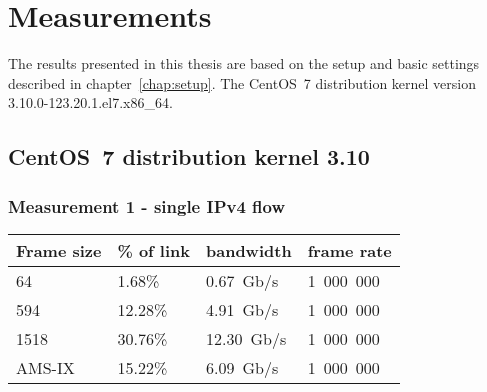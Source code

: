 
\chapter{Measurements}\label{chap:measurements}
The results presented in this thesis are based on the setup and basic settings described in chapter~\ref{chap:setup}.
The CentOS~7 distribution kernel version 3.10.0-123.20.1.el7.x86\_64.

\section{CentOS~7 distribution kernel 3.10}

\subsection{Measurement 1 - single IPv4 flow}
\begin{tabular}{ | l | l | l | l | }
\hline
Frame size & \% of link & bandwidth & frame rate \\
\hline
64     &  1.68\% &  0.67~Gb/s & 1~000~000 \\ %
594    & 12.28\% &  4.91~Gb/s & 1~000~000 \\ %
1518   & 30.76\% & 12.30~Gb/s & 1~000~000 \\ %
AMS-IX & 15.22\% &  6.09~Gb/s & 1~000~000 \\ %
\hline
\end{tabular}

